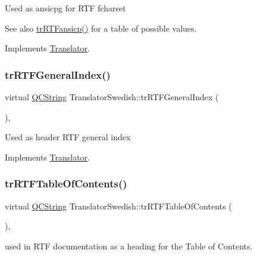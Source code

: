 Used as ansicpg for R\+TF fcharset \begin{DoxySeeAlso}{See also}
\mbox{\hyperlink{class_translator_swedish_aebe430c7fda5411e06f1f22f417fb961}{tr\+R\+T\+Fansicp()}} for a table of possible values. 
\end{DoxySeeAlso}


Implements \mbox{\hyperlink{class_translator_afad391f3cbfb5ce6332b7239f8e2049a}{Translator}}.

\mbox{\label{class_translator_swedish_aff612c7e94d8534b336246c3b325c210}} 
\subsubsection{\texorpdfstring{trRTFGeneralIndex()}{trRTFGeneralIndex()}}
{\footnotesize\ttfamily virtual \mbox{\hyperlink{class_q_c_string}{Q\+C\+String}} Translator\+Swedish\+::tr\+R\+T\+F\+General\+Index (\begin{DoxyParamCaption}{ }\end{DoxyParamCaption})\hspace{0.3cm}{\ttfamily [inline]}, {\ttfamily [virtual]}}

Used as header R\+TF general index 

Implements \mbox{\hyperlink{class_translator}{Translator}}.

\mbox{\label{class_translator_swedish_ad26f1bf2e88201d57a2ae600e65d2342}} 
\subsubsection{\texorpdfstring{trRTFTableOfContents()}{trRTFTableOfContents()}}
{\footnotesize\ttfamily virtual \mbox{\hyperlink{class_q_c_string}{Q\+C\+String}} Translator\+Swedish\+::tr\+R\+T\+F\+Table\+Of\+Contents (\begin{DoxyParamCaption}{ }\end{DoxyParamCaption})\hspace{0.3cm}{\ttfamily [inline]}, {\ttfamily [virtual]}}

used in R\+TF documentation as a heading for the Table of Contents. 


